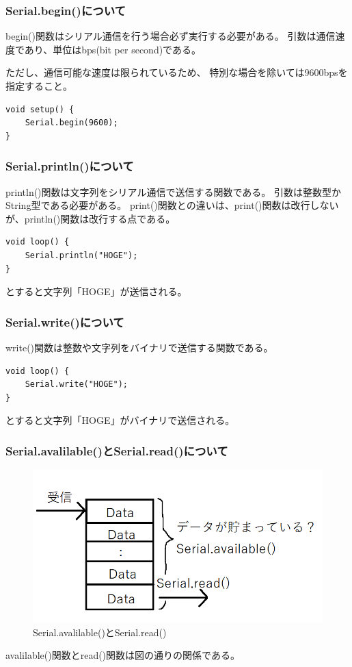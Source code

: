 \documentclass[uplatex]{jsarticle}
\begin{document}
\subsubsection{Serial.begin()について}
begin()関数はシリアル通信を行う場合必ず実行する必要がある。
引数は通信速度であり、単位はbps(bit per second)である。

ただし、通信可能な速度は限られているため、
特別な場合を除いては9600bpsを指定すること。
\begin{lstlisting}[basicstyle=\ttfamily\footnotesize, frame=single]
void setup() {
    Serial.begin(9600);
}
\end{lstlisting}
\subsubsection{Serial.println()について}
println()関数は文字列をシリアル通信で送信する関数である。
引数は整数型かString型である必要がある。
print()関数との違いは、print()関数は改行しないが、println()関数は改行する点である。
\begin{lstlisting}[basicstyle=\ttfamily\footnotesize, frame=single]
void loop() {
    Serial.println("HOGE");
}
\end{lstlisting}
とすると文字列「HOGE」が送信される。
\subsubsection{Serial.write()について}
write()関数は整数や文字列をバイナリで送信する関数である。
\begin{lstlisting}[basicstyle=\ttfamily\footnotesize, frame=single]
void loop() {
    Serial.write("HOGE");
}
\end{lstlisting}
とすると文字列「HOGE」がバイナリで送信される。
\subsubsection{Serial.avalilable()とSerial.read()について}
\begin{figure}[htbp]
    \centering
    \includegraphics[width=13cm]{serial_2.png}
    \caption{Serial.avalilable()とSerial.read()}
\end{figure}
avalilable()関数とread()関数は図の通りの関係である。
\end{document}
